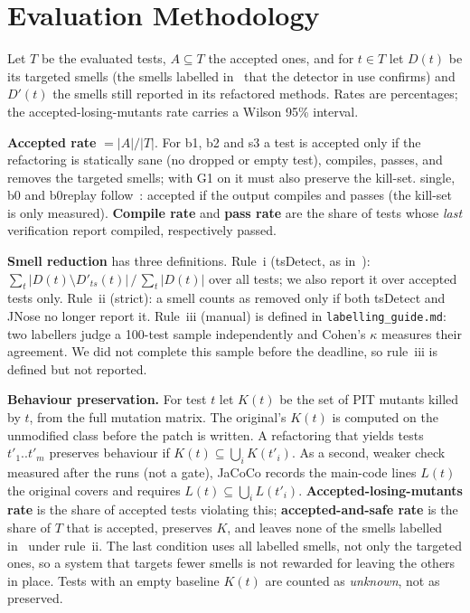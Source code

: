 \section{Evaluation Methodology}\label{sec:method}

Let $T$ be the evaluated tests, $A\subseteq T$ the accepted ones, and for $t\in T$ let $D(t)$ be its targeted smells (the smells labelled in~\cite{utrefactor}
that the detector in use confirms) and $D'(t)$ the smells still reported in its refactored methods. Rates are percentages; the accepted-losing-mutants rate carries a Wilson 95\% interval.

\textbf{Accepted rate} $=|A|/|T|$. For \textsf{b1}, \textsf{b2} and \textsf{s3} a test is accepted only if the refactoring is statically sane (no dropped or empty test), compiles, passes, and removes the targeted smells;
with G1 on it must also preserve the kill-set. \textsf{single}, \textsf{b0} and \textsf{b0replay} follow~\cite{utrefactor}: accepted if the output compiles and passes (the kill-set is only measured). \textbf{Compile rate} and \textbf{pass rate} are the share of tests whose \emph{last} verification report compiled, respectively passed.

\textbf{Smell reduction} has three definitions. Rule~i (tsDetect, as in~\cite{utrefactor}): $\sum_t|D(t)\setminus D'_{ts}(t)|\,/\,\sum_t|D(t)|$ over all tests; we also report it over accepted tests only.
Rule~ii (strict): a smell counts as removed only if both tsDetect and JNose no longer report it. Rule~iii (manual) is defined in \texttt{labelling\_guide.md}: two labellers judge a 100-test sample independently and Cohen's $\kappa$ measures their agreement. We did not complete this sample before the deadline, so rule~iii is defined but not reported.

\textbf{Behaviour preservation.} For test $t$ let $K(t)$ be the set of PIT mutants killed by $t$, from the full mutation matrix. The original's $K(t)$ is computed on the unmodified class
before the patch is written. A refactoring that yields tests $t'_1..t'_m$ preserves behaviour if $K(t)\subseteq\bigcup_i K(t'_i)$. As a second, weaker check measured after the runs (not a gate), JaCoCo records the main-code lines $L(t)$ the original covers and requires $L(t)\subseteq\bigcup_i L(t'_i)$.
\textbf{Accepted-losing-mutants rate} is the share of accepted tests violating this; \textbf{accepted-and-safe rate} is the share of $T$ that is accepted, preserves $K$, and leaves none of the smells labelled in~\cite{utrefactor} under rule~ii. The last condition uses all labelled smells, not only the targeted ones, so a system that targets fewer smells is not rewarded for leaving the others in place.
Tests with an empty baseline $K(t)$ are counted as \emph{unknown}, not as preserved.

